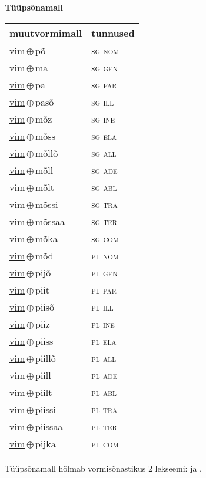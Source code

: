 

\vspace{3.5em}
\noindent \begin{minipage}{\textwidth}
\noindent \textbf{Tüüpsõnamall \,}\\

\begin{sideways}
\begin{tabular}{l l}
muutvormimall & tunnused \\
\hline
\underline{vim}\,$\oplus$\,põ & \textsc{ sg nom } \\
\underline{vim}\,$\oplus$\,ma & \textsc{ sg gen } \\
\underline{vim}\,$\oplus$\,pa & \textsc{ sg par } \\
\underline{vim}\,$\oplus$\,pasõ & \textsc{ sg ill } \\
\underline{vim}\,$\oplus$\,mõz & \textsc{ sg ine } \\
\underline{vim}\,$\oplus$\,mõss & \textsc{ sg ela } \\
\underline{vim}\,$\oplus$\,mõllõ & \textsc{ sg all } \\
\underline{vim}\,$\oplus$\,mõll & \textsc{ sg ade } \\
\underline{vim}\,$\oplus$\,mõlt & \textsc{ sg abl } \\
\underline{vim}\,$\oplus$\,mõssi & \textsc{ sg tra } \\
\underline{vim}\,$\oplus$\,mõssaa & \textsc{ sg ter } \\
\underline{vim}\,$\oplus$\,mõka & \textsc{ sg com } \\
\underline{vim}\,$\oplus$\,mõd & \textsc{ pl nom } \\
\underline{vim}\,$\oplus$\,pijõ & \textsc{ pl gen } \\
\underline{vim}\,$\oplus$\,piit & \textsc{ pl par } \\
\underline{vim}\,$\oplus$\,piisõ & \textsc{ pl ill } \\
\underline{vim}\,$\oplus$\,piiz & \textsc{ pl ine } \\
\underline{vim}\,$\oplus$\,piiss & \textsc{ pl ela } \\
\underline{vim}\,$\oplus$\,piillõ & \textsc{ pl all } \\
\underline{vim}\,$\oplus$\,piill & \textsc{ pl ade } \\
\underline{vim}\,$\oplus$\,piilt & \textsc{ pl abl } \\
\underline{vim}\,$\oplus$\,piissi & \textsc{ pl tra } \\
\underline{vim}\,$\oplus$\,piissaa & \textsc{ pl ter } \\
\underline{vim}\,$\oplus$\,pijka & \textsc{ pl com } \\
\end{tabular}
\end{sideways}
\label{tab:tüüpsõnamall-vimpõ}

\end{minipage}

 
\vspace{1em}
\noindent Tüüpsõnamall  hõlmab vormisõnastikus 2 lekseemi:  ja .
